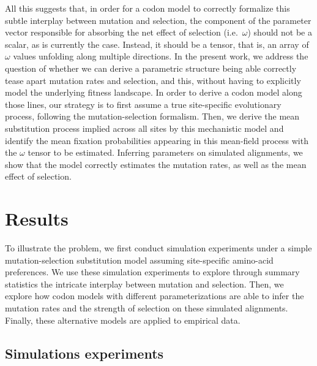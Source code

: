 \documentclass{article}
\begin{document}
All this suggests that, in order for a codon model to correctly formalize this subtle interplay between mutation and selection, the component of the parameter vector responsible for absorbing the net effect of selection (i.e.~$\omega$) should not be a scalar, as is currently the case.
Instead, it should be a tensor, that is, an array of $\omega$ values unfolding along multiple directions.
In the present work, we address the question of whether we can derive a parametric structure being able correctly tease apart mutation rates and selection, and this, without having to explicitly model the underlying fitness landscape.
In order to derive a codon model along those lines, our strategy is to first assume a true site-specific evolutionary process, following the mutation-selection formalism.
Then, we derive the mean {substitution} process implied across all sites by this mechanistic model and identify the mean fixation probabilities appearing in this mean-field process with the $\omega$ tensor to be estimated.
Inferring parameters on simulated alignments, we show that the model correctly estimates the mutation rates, as well as the mean effect of selection.

\section{Results}
\label{sec:results}

To illustrate the problem, we first conduct simulation experiments under a simple mutation-selection {substitution} model assuming site-specific amino-acid preferences.
We use these simulation experiments to explore through summary statistics the intricate interplay between mutation and selection.
Then, we explore how codon models with different parameterizations are able to infer the mutation rates and the strength of selection on these simulated alignments.
Finally, these alternative models are applied to empirical data.

\subsection{Simulations experiments}
\label{subsec:simulations-experiments}
\end{document}
